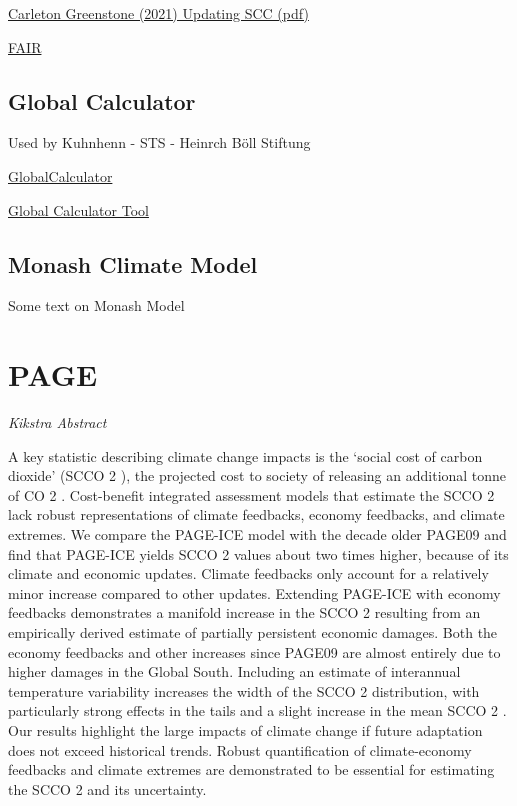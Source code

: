 \documentclass[
]{book}
\begin{document}
\href{pdf/Greenstone_2021_Updating_SCC.pdf}{Carleton Greenstone (2021) Updating SCC (pdf)}

\href{https://fair.readthedocs.io/en/latest/}{FAIR}

\hypertarget{global-calculator}{%
\section{Global Calculator}\label{global-calculator}}

Used by Kuhnhenn - STS - Heinrch Böll Stiftung

\href{http://www.globalcalculator.org/}{GlobalCalculator}

\href{http://tool.globalcalculator.org/globcalc.html?levers=22rfoe2e\%2013be1111c2c2c1n31hfjdcef222hp233f211111fn2211111111/dashboard/en}{Global Calculator Tool}

\hypertarget{monash-climate-model}{%
\section{Monash Climate Model}\label{monash-climate-model}}

Some text on Monash Model

\hypertarget{page}{%
\chapter{PAGE}\label{page}}

\emph{Kikstra Abstract}

A key statistic describing climate change impacts is the `social cost of carbon dioxide' (SCCO 2 ), the
projected cost to society of releasing an additional tonne of CO 2 . Cost-benefit integrated
assessment models that estimate the SCCO 2 lack robust representations of climate feedbacks,
economy feedbacks, and climate extremes. We compare the PAGE-ICE model with the decade
older PAGE09 and find that PAGE-ICE yields SCCO 2 values about two times higher, because of its
climate and economic updates. Climate feedbacks only account for a relatively minor increase
compared to other updates. Extending PAGE-ICE with economy feedbacks demonstrates a
manifold increase in the SCCO 2 resulting from an empirically derived estimate of partially
persistent economic damages. Both the economy feedbacks and other increases since PAGE09 are
almost entirely due to higher damages in the Global South. Including an estimate of interannual
temperature variability increases the width of the SCCO 2 distribution, with particularly strong
effects in the tails and a slight increase in the mean SCCO 2 . Our results highlight the large impacts
of climate change if future adaptation does not exceed historical trends. Robust quantification of
climate-economy feedbacks and climate extremes are demonstrated to be essential for estimating
the SCCO 2 and its uncertainty.
\end{document}
